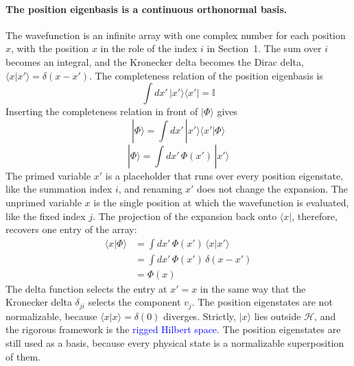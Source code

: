 \paragraph{The position eigenbasis is a continuous orthonormal basis.} The wavefunction is an infinite array with one complex number for each position $x$, with the position $x$ in the role of the index $i$ in Section~1. The sum over $i$ becomes an integral, and the Kronecker delta becomes the Dirac delta, $\langle x | x' \rangle = \delta(x - x')$. The completeness relation of the position eigenbasis is
\begin{equation*}
    \int dx'\, |x'\rangle\langle x'| = \mathbb{I}
\end{equation*}
Inserting the completeness relation in front of $|\Phi\rangle$ gives
\begin{equation*}
    |\Phi\rangle = \int dx'\, |x'\rangle\langle x' | \Phi \rangle
\end{equation*}
\begin{equation}
    \boxed{|\Phi\rangle = \int dx'\, \Phi(x')\, |x'\rangle}
\end{equation}
The primed variable $x'$ is a placeholder that runs over every position eigenstate, like the summation index $i$, and renaming $x'$ does not change the expansion. The unprimed variable $x$ is the single position at which the wavefunction is evaluated, like the fixed index $j$. The projection of the expansion back onto $\langle x|$, therefore, recovers one entry of the array:
\begin{align*}
    \langle x | \Phi \rangle &= \int dx'\, \Phi(x')\, \langle x | x' \rangle \\
    &= \int dx'\, \Phi(x')\, \delta(x - x') \\
    &= \Phi(x)
\end{align*}
The delta function selects the entry at $x' = x$ in the same way that the Kronecker delta $\delta_{ji}$ selects the component $v_j$. The position eigenstates are not normalizable, because $\langle x | x \rangle = \delta(0)$ diverges. Strictly, $|x\rangle$ lies outside $\mathcal{H}$, and the rigorous framework is the \textcolor{blue}{rigged Hilbert space}. The position eigenstates are still used as a basis, because every physical state is a normalizable superposition of them.


